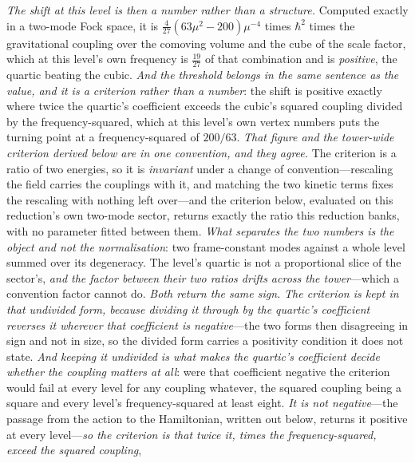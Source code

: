 \documentclass[11pt,a4paper]{article}
\theoremstyle{plain}
\theoremstyle{definition}
\theoremstyle{remark}
\begin{document}
\emph{The shift at this level is then a number rather than a structure.} Computed exactly in a two-mode Fock
space, it is $\tfrac{4}{27}(63\mu^{2}-200)\mu^{-4}$ times $\hbar^{2}$ times the gravitational coupling over
the comoving volume and the cube of the scale factor, which at this level's own frequency is $\tfrac{19}{27}$
of that combination and is \emph{positive}, the quartic beating the cubic. \emph{And the threshold belongs in
the same sentence as the value, and it is a criterion rather than a number}: the shift is positive exactly
where twice the quartic's coefficient exceeds the cubic's squared coupling divided by the frequency-squared,
which at this level's own vertex numbers puts the turning point at a frequency-squared of $200/63$.
\emph{That figure and the tower-wide criterion derived below are in one convention, and they agree.} The
criterion is a ratio of two energies, so it is \emph{invariant} under a change of convention---rescaling the
field carries the couplings with it, and matching the two kinetic terms fixes the rescaling with nothing left
over---and the criterion below, evaluated on this reduction's own two-mode sector, returns exactly the ratio
this reduction banks, with no parameter fitted between them. \emph{What separates the two numbers is the object
and not the normalisation}: two frame-constant modes against a whole level summed over its degeneracy. The
level's quartic is not a proportional slice of the sector's, \emph{and the factor between their two ratios drifts
across the tower}---which a convention factor cannot do. \emph{Both return the same sign.}
\emph{The criterion is kept in that undivided form, because dividing it through by the quartic's coefficient
reverses it wherever that coefficient is negative}---the two forms then disagreeing in sign and not in size,
so the divided form carries a positivity condition it does not state. \emph{And keeping it undivided is what makes the quartic's coefficient decide whether the coupling matters at
all}: were that coefficient negative the criterion would fail at every level for any coupling whatever, the
squared coupling being a square and every level's frequency-squared at least eight. \emph{It is not
negative}---the passage from the action to the Hamiltonian, written out below, returns it positive at every
level---\emph{so the criterion is that twice it, times the frequency-squared, exceed the squared coupling},
\end{document}

